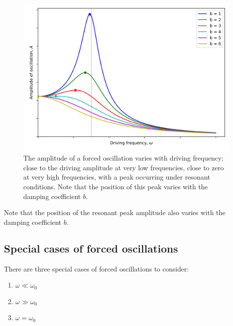 \documentclass[
]{book}
\providecommand{\tightlist}{%
  \setlength{\itemsep}{0pt}\setlength{\parskip}{0pt}}
\begin{document}
\begin{figure}

{\centering \includegraphics[width=0.7\linewidth]{visualisations/ch5-forcedosc1} 

}

\caption{The amplitude of a forced oscillation varies with driving frequency; close to the driving amplitude at very low frequencies, close to zero at very high frequencies, with a peak occurring under resonant conditions. Note that the position of this peak varies with the damping coefficient $b$.}\label{fig:ch5-forcedoscilfull1}
\end{figure}

Note that the position of the resonant peak amplitude also varies with the damping coefficient \(b\).

\hypertarget{special-cases-of-forced-oscillations}{%
\subsection{Special cases of forced oscillations}\label{special-cases-of-forced-oscillations}}

There are three special cases of forced oscillations to consider:

\begin{enumerate}
\def\labelenumi{\arabic{enumi}.}
\tightlist
\item
  \(\omega \ll \omega_0\)
\item
  \(\omega \gg \omega_0\)
\item
  \(\omega = \omega_0\)
\end{enumerate}
\end{document}
